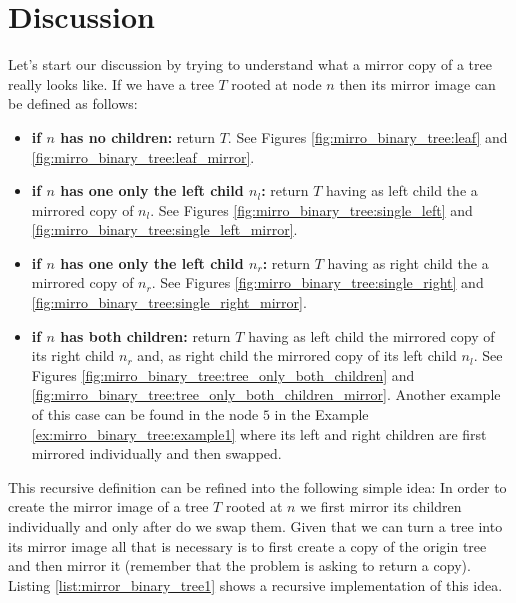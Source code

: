 


\section{Discussion}
\label{mirror_binary_tree:sec:discussion}
Let's start our discussion by trying to understand what a mirror copy of a tree really looks like. If
we have a tree $T$ rooted at node $n$ then its mirror image  can be defined as
follows:
\begin{itemize}
	\item \textbf{if $n$ has no children:} return  $T$. See Figures \ref{fig:mirro_binary_tree:leaf}
	and \ref{fig:mirro_binary_tree:leaf_mirror}.
	\item \textbf{if $n$ has one only the left child $n_l$:}  return $T$ having as left child the a
	mirrored copy of $n_l$. See Figures \ref{fig:mirro_binary_tree:single_left} and
	\ref{fig:mirro_binary_tree:single_left_mirror}.
	\item \textbf{if $n$ has one only the left child $n_r$:}  return $T$ having as right child the a
	mirrored copy of $n_r$. See Figures \ref{fig:mirro_binary_tree:single_right} and
	\ref{fig:mirro_binary_tree:single_right_mirror}. 
	\item \textbf{if $n$ has both children:} return $T$ having as left child the mirrored copy of
	 its right child $n_r$ and, as right child the mirrored copy of its left child $n_l$.  See
	 Figures \ref{fig:mirro_binary_tree:tree_only_both_children} and
	 \ref{fig:mirro_binary_tree:tree_only_both_children_mirror}. Another example of this case can be
	 found in the node $5$ in the Example \ref{ex:mirro_binary_tree:example1} where its left and
	 right children are first mirrored individually and then swapped. 
\end{itemize}
This recursive definition can be refined into the following simple idea: In order to create the
mirror image of a tree $T$ rooted at $n$ we first mirror its children individually and only
after do we swap them. Given that we can turn a tree into its mirror image all that is  necessary is to first create a copy of the origin tree
and then mirror it (remember that the problem is asking to return a copy). 
Listing \ref{list:mirror_binary_tree1} shows a recursive implementation of this
idea.


